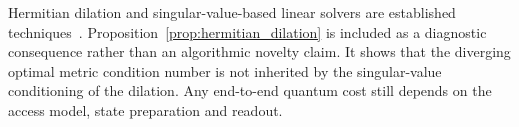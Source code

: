 \begin{remark}
Hermitian dilation and singular-value-based linear solvers are established
techniques~\cite{Gilyen2019,Berry2026}.  Proposition~\ref{prop:hermitian_dilation}
is included as a diagnostic consequence rather than an algorithmic novelty claim.  It shows
that the diverging optimal metric condition number is not inherited by the singular-value
conditioning of the dilation.  Any end-to-end quantum cost still depends on the access model,
state preparation and readout.
\end{remark}
